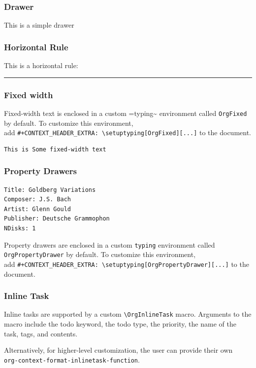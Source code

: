 \documentclass[11pt]{article}
\begin{document}
\subsubsection{Drawer}
\label{sec:orgedca8c4}
This is a simple drawer
\subsubsection{Horizontal Rule}
\label{sec:org7dd17b5}
This is a horizontal rule:

\noindent\rule{\textwidth}{0.5pt}
\subsubsection{Fixed width}
\label{sec:org3793ae5}
Fixed-width text is enclosed in a custom =typing\textasciitilde{} environment
called \texttt{OrgFixed} by default. To customize this environment,\\
add \texttt{\#+CONTEXT\_HEADER\_EXTRA: \textbackslash{}setuptyping[OrgFixed][...]}
to the document.
\begin{verbatim}
This is Some fixed-width text
\end{verbatim}

\subsubsection{Property Drawers}
\label{sec:org6d248b8}
\begin{verbatim}
Title: Goldberg Variations
Composer: J.S. Bach
Artist: Glenn Gould
Publisher: Deutsche Grammophon
NDisks: 1
\end{verbatim}
Property drawers are enclosed in a custom \texttt{typing} environment
called \texttt{OrgPropertyDrawer} by default. To customize this environment,\\
add \texttt{\#+CONTEXT\_HEADER\_EXTRA: \textbackslash{}setuptyping[OrgPropertyDrawer][...]}
to the document.

\subsubsection{Inline Task}
\label{sec:org9bee487}
Inline tasks are supported by a custom \texttt{\textbackslash{}OrgInlineTask} macro.
Arguments to the macro include the todo keyword, the todo type,
the priority, the name of the task, tags, and contents.

Alternatively, for higher-level customization, the user can
provide their own\\
\texttt{org-context-format-inlinetask-function}.
\end{document}
